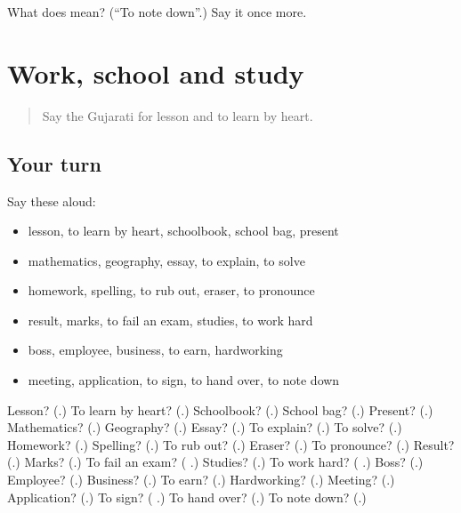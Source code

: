 \begin{tcolorbox}[breakable,colback=teal!4,colframe=teal!35!black,title={Before you move on}]
What does  mean? (\textquotedblleft{}To note down\textquotedblright{}.) Say it once more.
\end{tcolorbox}
\section[(dialogue)]{Work, school and study}

\label{lesson:GU-R248-review-243-248}



\begin{quote}
Say the Gujarati for lesson and to learn by heart.
\end{quote}

\subsection*{Your turn}
Say these aloud:

\begin{itemize}
\raggedright
  \item lesson, to learn by heart, schoolbook, school bag, present
  \item mathematics, geography, essay, to explain, to solve
  \item homework, spelling, to rub out, eraser, to pronounce
  \item result, marks, to fail an exam, studies, to work hard
  \item boss, employee, business, to earn, hardworking
  \item meeting, application, to sign, to hand over, to note down
\end{itemize}

\begin{tcolorbox}[breakable,colback=teal!4,colframe=teal!35!black,title={Before you move on}]
Lesson? (\textbf{}.) To learn by heart? (\textbf{}.) Schoolbook? (\textbf{}.) School bag? (\textbf{}.) Present? (\textbf{}.) Mathematics? (\textbf{}.) Geography? (\textbf{}.) Essay? (\textbf{}.) To explain? (\textbf{}.) To solve? (\textbf{}.) Homework? (\textbf{}.) Spelling? (\textbf{}.) To rub out? (\textbf{}.) Eraser? (\textbf{}.) To pronounce? (\textbf{}.) Result? (\textbf{}.) Marks? (\textbf{}.) To fail an exam? (\textbf{ }.) Studies? (\textbf{}.) To work hard? (\textbf{ }.) Boss? (\textbf{}.) Employee? (\textbf{}.) Business? (\textbf{}.) To earn? (\textbf{}.) Hardworking? (\textbf{}.) Meeting? (\textbf{}.) Application? (\textbf{}.) To sign? (\textbf{ }.) To hand over? (\textbf{}.) To note down? (\textbf{}.)
\end{tcolorbox}

